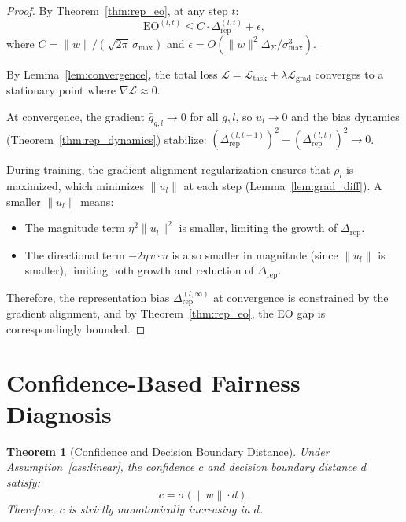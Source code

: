 \documentclass[11pt]{article}
\newtheorem{theorem}{Theorem}
\begin{document}
\begin{proof}
    By Theorem~\ref{thm:rep_eo}, at any step $t$:
    \begin{equation}
        \mathrm{EO}^{(l,t)} \leq C \cdot \Delta_{\mathrm{rep}}^{(l,t)} + \epsilon,
    \end{equation}
    where $C = \|w\|/(\sqrt{2\pi}\,\sigma_{\max})$ and $\epsilon = O(\|w\|^2 \Delta_\Sigma / \sigma_{\max}^3)$.

    By Lemma~\ref{lem:convergence}, the total loss $\mathcal{L} = \mathcal{L}_{\text{task}} + \lambda \mathcal{L}_{\mathrm{grad}}$ converges to a stationary point where $\nabla \mathcal{L} \approx 0$.

    At convergence, the gradient $\bar{g}_{g,l} \to 0$ for all $g, l$, so $u_l \to 0$ and the bias dynamics (Theorem~\ref{thm:rep_dynamics}) stabilize: $\left(\Delta_{\mathrm{rep}}^{(l,t+1)}\right)^2 - \left(\Delta_{\mathrm{rep}}^{(l,t)}\right)^2 \to 0$.

    During training, the gradient alignment regularization ensures that $\rho_l$ is maximized, which minimizes $\|u_l\|$ at each step (Lemma~\ref{lem:grad_diff}). A smaller $\|u_l\|$ means:
    \begin{itemize}
        \item The magnitude term $\eta^2\|u_l\|^2$ is smaller, limiting the growth of $\Delta_{\mathrm{rep}}$.
        \item The directional term $-2\eta\, v \cdot u$ is also smaller in magnitude (since $\|u_l\|$ is smaller), limiting both growth and reduction of $\Delta_{\mathrm{rep}}$.
    \end{itemize}
    Therefore, the representation bias $\Delta_{\mathrm{rep}}^{(l,\infty)}$ at convergence is constrained by the gradient alignment, and by Theorem~\ref{thm:rep_eo}, the EO gap is correspondingly bounded.
\end{proof}


\section{Confidence-Based Fairness Diagnosis}

\begin{theorem}[Confidence and Decision Boundary Distance]
    \label{thm:conf_dist}
    Under Assumption~\ref{ass:linear}, the confidence $c$ and decision boundary distance $d$ satisfy:
    \begin{equation}
        c = \sigma(\|w\| \cdot d).
    \end{equation}
    Therefore, $c$ is strictly monotonically increasing in $d$.
\end{theorem}
\end{document}
